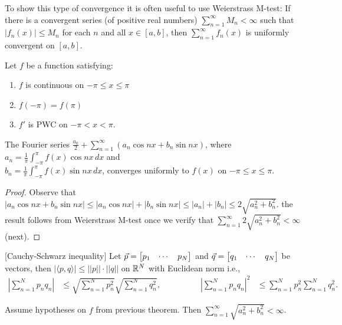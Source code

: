 \documentclass[]{article}
\begin{document}
To show this type of convergence it is often useful to use Weierstrass M-test: If there is a convergent series (of positive real numbers) $\sum_{n=1}^\infty M_n < \infty$ such that $|f_n(x)|\leq M_n$ for each $n$ and all $x\in[a,b]$, then $\sum_{n=1}^\infty f_n(x)$ is uniformly convergent on $[a,b]$.
\begin{theorem}
	Let $f$ be a function satisfying:
	\begin{enumerate}
		\item $f$ is continuous on $-\pi\leq x \leq \pi$
		\item $f(-\pi) = f(\pi)$
		\item $f'$ is PWC on $-\pi< x < \pi$.
	\end{enumerate}
	The Fourier series $\frac{a_0}{2} + \sum_{n=1}^\infty (a_n\cos{nx}+b_n\sin{nx})$, where $a_n=\frac{1}{\pi}\int_{-\pi}^\pi f(x) \cos{nx}\, dx$ and \\ $b_n=\frac{1}{\pi} \int_{-\pi}^\pi f(x) \sin{nx}\, dx$, converges uniformly to $f(x)$ on $-\pi \leq x \leq \pi$.
\end{theorem}
\begin{proof}
	Observe that $|a_n \cos{nx} + b_n\sin{nx} | \leq |a_n\cos{nx}| + |b_n\sin{nx}|\leq |a_n|+ |b_n| \leq 2\sqrt{a_n^2+b_n^2}$. the result follows from Weierstrass M-test once we verify that $\sum_{n=1}^\infty 2\sqrt{a_n^2 + b_n^2} <\infty$ (next).
\end{proof}
\begin{definition}
	[Cauchy-Schwarz inequality] Let $\vec{p} = \begin{bmatrix} p_1 & \cdots & p_N\end{bmatrix}$ and $\vec{q} = \begin{bmatrix}q_1 & \cdots & q_N\end{bmatrix}$ be vectors, then $|\langle p,q\rangle |\leq ||p||\cdot||q||$ on $\mathbb{R}^N$ with Euclidean norm i.e.,
	\begin{align*}
		\left|\sum_{n=1}^N p_nq_n\right| &\leq \sqrt{\sum_{n=1}^N p_n^2}\sqrt{\sum_{n=1}^N{q_n^2}}, \qquad & \qquad
		\left| \sum_{n=1}^N p_n q_n \right|^2 &\leq \sum_{n=1}^N p_n^2 \sum_{n=1}^N q_n^2.
	\end{align*}
\end{definition}
\begin{lemma}
	Assume hypotheses on $f$ from previous theorem. Then $\sum_{n=1}^\infty \sqrt{a_n^2+b_n^2}<\infty$.
\end{lemma}
\end{document}
